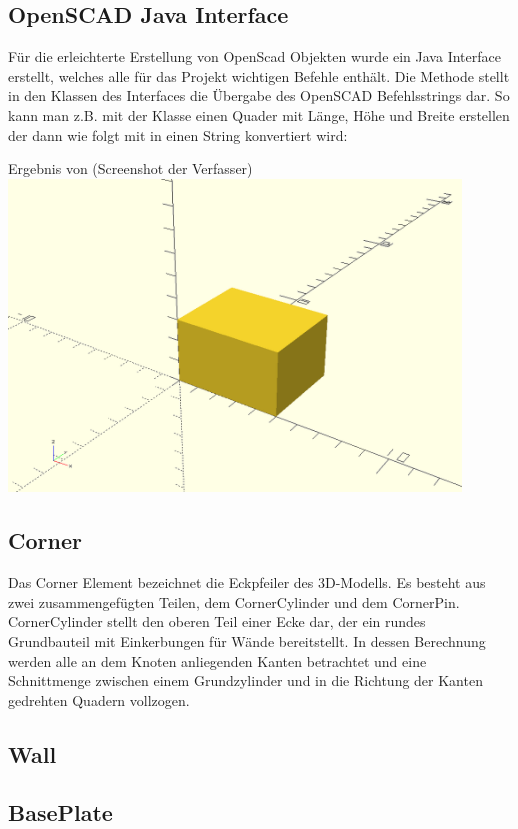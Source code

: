 \subsection{OpenSCAD Java Interface}
Für die erleichterte Erstellung von OpenScad Objekten wurde ein Java Interface  erstellt, welches alle für das Projekt wichtigen Befehle enthält.
Die Methode  stellt in den Klassen des Interfaces die Übergabe des OpenSCAD Befehlsstrings dar.
So kann man z.B. mit der Klasse  einen Quader mit Länge, Höhe und Breite erstellen der dann wie folgt mit  in einen String konvertiert wird:
\\
\begin{Bild}{Ergebnis von  (Screenshot der Verfasser)}
	\includegraphics[width = 120mm]{Bilder/Quader}
\end{Bild}

\subsection{Corner}
Das Corner Element bezeichnet die Eckpfeiler des 3D-Modells.
Es besteht aus zwei zusammengefügten Teilen, dem CornerCylinder und dem CornerPin.
CornerCylinder stellt den oberen Teil einer Ecke dar, der ein rundes Grundbauteil mit Einkerbungen für Wände bereitstellt.
In dessen Berechnung werden alle an dem Knoten anliegenden Kanten betrachtet und eine Schnittmenge zwischen einem Grundzylinder und in die Richtung der Kanten gedrehten Quadern vollzogen.\\
\subsection{Wall}
\subsection{BasePlate}